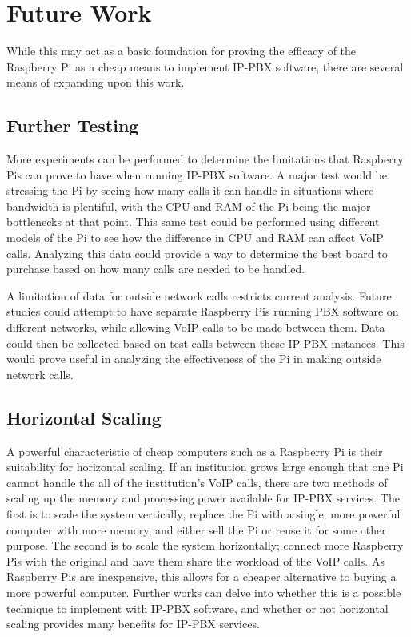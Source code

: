 \section{Future Work}
    While this may act as a basic foundation for proving the efficacy of the Raspberry Pi as a cheap means to implement IP-PBX software, there are several means of expanding upon this work.
    \subsection{Further Testing}
        More experiments can be performed to determine the limitations that Raspberry Pis can prove to have when running IP-PBX software. A major test would be stressing the Pi by seeing how many calls it can handle in situations where bandwidth is plentiful, with the CPU and RAM of the Pi being the major bottlenecks at that point. This same test could be performed using different models of the Pi to see how the difference in CPU and RAM can affect VoIP calls. Analyzing this data could provide a way to determine the best board to purchase based on how many calls are needed to be handled.
        
        A limitation of data for outside network calls restricts current analysis. Future studies could attempt to have separate Raspberry Pis running PBX software on different networks, while allowing VoIP calls to be made between them. Data could then be collected based on test calls between these IP-PBX instances. This would prove useful in analyzing the effectiveness of the Pi in making outside network calls.
    \subsection{Horizontal Scaling}
        A powerful characteristic of cheap computers such as a Raspberry Pi is their suitability for horizontal scaling. If an institution grows large enough that one Pi cannot handle the all of the institution's VoIP calls, there are two methods of scaling up the memory and processing power available for IP-PBX services. The first is to scale the system vertically; replace the Pi with a single, more powerful computer with more memory, and either sell the Pi or reuse it for some other purpose. The second is to scale the system horizontally; connect more Raspberry Pis with the original and have them share the workload of the VoIP calls. As Raspberry Pis are inexpensive, this allows for a cheaper alternative to buying a more powerful computer. Further works can delve into whether this is a possible technique to implement with IP-PBX software, and whether or not horizontal scaling provides many benefits for IP-PBX services.